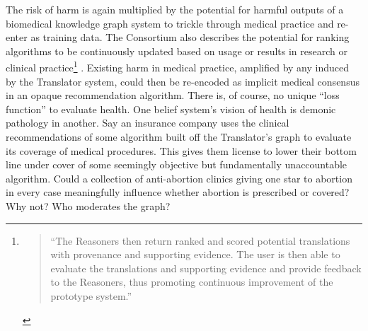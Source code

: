 The risk of harm is again multiplied by the potential for harmful
outputs of a biomedical knowledge graph system to trickle through
medical practice and re-enter as training data. The Consortium also
describes the potential for ranking algorithms to be continuously
updated based on usage or results in research or clinical
practice\footnote{\begin{quote}
  ``The Reasoners then return ranked and scored potential translations
  with provenance and supporting evidence. The user is then able to
  evaluate the translations and supporting evidence and provide feedback
  to the Reasoners, thus promoting continuous improvement of the
  prototype system.'' \cite{consortiumUniversalBiomedicalData2019} 
  \end{quote}} \cite{consortiumUniversalBiomedicalData2019} .
Existing harm in medical practice, amplified by any induced by the
Translator system, could then be re-encoded as implicit medical
consensus in an opaque recommendation algorithm. There is, of course, no
unique ``loss function'' to evaluate health. One belief system's vision
of health is demonic pathology in another. Say an insurance company uses
the clinical recommendations of some algorithm built off the
Translator's graph to evaluate its coverage of medical procedures. This
gives them license to lower their bottom line under cover of some
seemingly objective but fundamentally unaccountable algorithm. Could a
collection of anti-abortion clinics giving one star to abortion in every
case meaningfully influence whether abortion is prescribed or covered?
Why not? Who moderates the graph?

